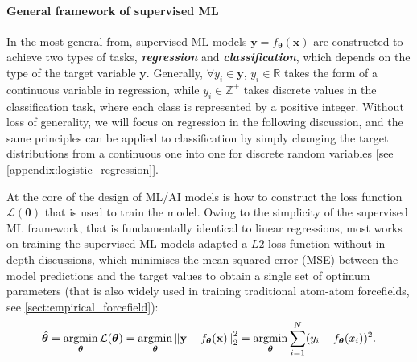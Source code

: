\paragraph{\textbf{General framework of supervised ML}}
In the most general from, supervised ML models $\bm{y}=f_{\boldsymbol{\theta}}(\bm{x})$ are constructed to achieve two types of tasks, \textbf{\textit{regression}} and \textbf{\textit{classification}}, which depends on the type of the target variable $\bm{y}$. Generally, $\forall y_i\in\bm{y}$, $y_i\in\mathbb{R}$ takes the form of a continuous variable in regression, while $y_i\in\mathbb{Z}^{+}$ takes discrete values in the classification task, where each class is represented by a positive integer. Without loss of generality, we will focus on regression in the following discussion, and the same principles can be applied to classification by simply changing the target distributions from a continuous one into one for discrete random variables [see \cref{appendix:logistic_regression}].

At the core of the design of ML/AI models is how to construct the loss function $\mathcal{L}(\boldsymbol{\theta})$ that is used to train the model. Owing to the simplicity of the supervised ML framework, that is fundamentally identical to linear regressions, most works on training the supervised ML models adapted a $L2$ loss function without in-depth discussions, which minimises the mean squared error (MSE) between the model predictions and the target values to obtain a single set of optimum parameters (that is also widely used in training traditional atom-atom forcefields, see \cref{sect:empirical_forcefield}):
\begin{equation}
    \label{eq:simple_ML_optimisation}
    \hat{\boldsymbol{\theta}}=\operatorname*{argmin}_{\boldsymbol{\theta}}\mathcal{L}(\boldsymbol{\theta})=\operatorname*{argmin}_{\boldsymbol{\theta}}\left\Vert \mathbf{y}-f_{\boldsymbol{\theta}}(\mathbf{x})\right\Vert^2_2=\operatorname*{argmin}_{\boldsymbol{\theta}}\sum_{i=1}^N (y_i-f_{\boldsymbol{\theta}}(x_i))^2.
\end{equation}


